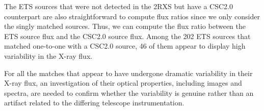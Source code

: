 The ETS sources that were not detected in the 2RXS but have a CSC2.0 counterpart are also straightforward to compute flux ratios since we only consider the singly matched sources. 
Thus, we can compute the flux ratio between the ETS source flux and the CSC2.0 source flux. 
Among the 202 ETS sources that matched one-to-one with a CSC2.0 source, 46 of them appear to display high variability in the X-ray flux.

For all the matches that appear to have undergone dramatic variability in their X-ray flux, an investigation of their optical properties, including images and spectra, are needed to confirm whether the variability is genuine rather than an artifact related to the differing telescope instrumentation. 



